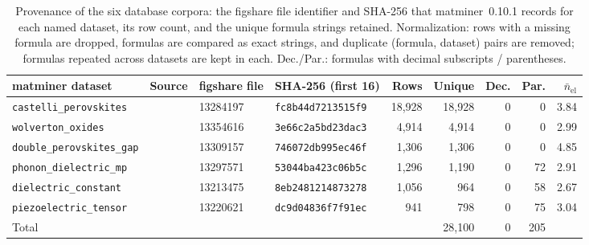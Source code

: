 \begin{table}[!t]
\centering
\caption{Provenance of the six database corpora: the figshare file identifier and SHA-256 that matminer~0.10.1 records for each named dataset, its row count, and the unique formula strings retained. Normalization: rows with a missing formula are dropped, formulas are compared as exact strings, and duplicate (formula, dataset) pairs are removed; formulas repeated across datasets are kept in each. Dec./Par.: formulas with decimal subscripts / parentheses.}
\label{tab:provenance}
\footnotesize
\setlength{\tabcolsep}{4pt}
\begin{tabular}{@{}llllrrrrr@{}}
\toprule
matminer dataset & Source & figshare file & SHA-256 (first 16) & Rows & Unique & Dec. & Par. & $\bar n_{\mathrm{el}}$ \\
\midrule
\texttt{castelli\_perovskites} & \cite{castelli2012perovskites} & 13284197 & \texttt{fc8b44d7213515f9} & 18{,}928 & 18{,}928 & 0 & 0 & 3.84 \\
\texttt{wolverton\_oxides} & \cite{emery2017perovskites} & 13354616 & \texttt{3e66c2a5bd23dac3} & 4{,}914 & 4{,}914 & 0 & 0 & 2.99 \\
\texttt{double\_perovskites\_gap} & \cite{pilania2016doubleperovskites} & 13309157 & \texttt{746072db995ec46f} & 1{,}306 & 1{,}306 & 0 & 0 & 4.85 \\
\texttt{phonon\_dielectric\_mp} & \cite{petretto2018phonons} & 13297571 & \texttt{53044ba423c06b5c} & 1{,}296 & 1{,}190 & 0 & 72 & 2.91 \\
\texttt{dielectric\_constant} & \cite{petousis2017dielectric} & 13213475 & \texttt{8eb2481214873278} & 1{,}056 & 964 & 0 & 58 & 2.67 \\
\texttt{piezoelectric\_tensor} & \cite{dejong2015piezo} & 13220621 & \texttt{dc9d04836f7f91ec} & 941 & 798 & 0 & 75 & 3.04 \\
\midrule
Total & & & & & 28{,}100 & 0 & 205 & \\
\bottomrule
\end{tabular}
\end{table}
